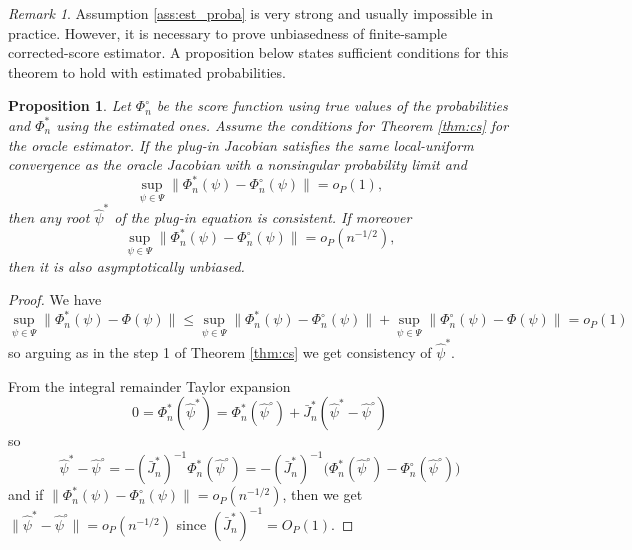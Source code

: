 \documentclass[11pt]{article}
\newtheorem{proposition}{Proposition}
\theoremstyle{definition}
\theoremstyle{remark}
\newtheorem{remark}{Remark}
\begin{document}
\begin{remark}\label{rem:probas}
    Assumption \ref{ass:est_proba} is very strong and usually impossible in practice. However, it is necessary to prove unbiasedness of finite-sample corrected-score estimator. A proposition below states sufficient conditions for this theorem to hold with estimated probabilities.
\end{remark}
\begin{proposition}\label{prop:est_prob}
    Let $\Phi_n^\circ$ be the score function using true values of the probabilities and $\Phi_n^*$ using the estimated ones. Assume the conditions for Theorem \ref{thm:cs} for the oracle estimator. If the plug-in Jacobian satisfies the same local-uniform convergence as the oracle Jacobian with a nonsingular probability limit and 
    \[  \sup_{\psi\in \Psi} \| \Phi_n^*(\psi)-\Phi_n^\circ(\psi) \| = o_P(1), \]
    then any root $\hat\psi^*$ of the plug-in equation is consistent. If moreover
    \[  \sup_{\psi\in \Psi} \| \Phi_n^*(\psi)-\Phi_n^\circ(\psi) \| = o_P(n^{-1/2}), \]
    then it is also asymptotically unbiased.
\end{proposition}
\begin{proof}
    We have
    \[ \sup_{\psi \in\Psi} \| \Phi_n^*(\psi) - \Phi(\psi) \| \leq \sup_{\psi \in\Psi} \| \Phi_n^*(\psi) - \Phi_n^\circ(\psi) \| + \sup_{\psi \in\Psi} \| \Phi_n^\circ(\psi) - \Phi(\psi) \| = o_P(1)  \]
    so arguing as in the step 1 of Theorem \ref{thm:cs} we get consistency of $\hat\psi^*.$
    
    From the integral remainder Taylor expansion
    \[ 0=\Phi_n^*(\hat\psi^*) = \Phi_n^*(\hat\psi^\circ)+\bar J_n^* (\hat\psi^*-\hat\psi^\circ) \]
    so
    \[ \hat\psi^*-\hat\psi^\circ = - (\bar J_n^*)^{-1}\Phi_n^*(\hat\psi^\circ) = -(\bar J_n^*)^{-1}\big(\Phi_n^*(\hat\psi^\circ) - \Phi_n^\circ(\hat\psi^\circ)\big) \]
    and if $\| \Phi_n^*(\psi)-\Phi_n^\circ(\psi) \|=o_P(n^{-1/2})$, then we get $\| \hat\psi^* - \hat\psi^\circ \| = o_P(n^{-1/2})$ since $(\bar J_n^*)^{-1}=O_P(1)$.
\end{proof}

\end{document}
